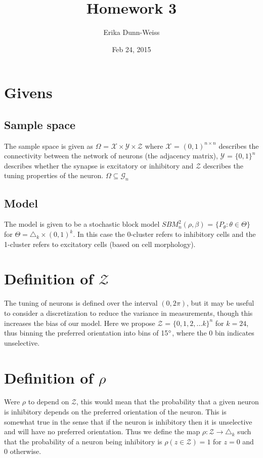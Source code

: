 \documentclass[psamsfonts]{amsart}
\title{Homework 3}
\author{Erika Dunn-Weiss}
\date{Feb 24, 2015}
\begin{document}
\maketitle

\section{Givens}
\subsection{Sample space} The sample space is given as $\Omega$ = $\mathcal{X} \times \mathcal{Y} \times \mathcal{Z}$
where $\mathcal{X}$ = $(0,1)^{n \times n}$ describes the connectivity between the network of neurons (the adjacency matrix), $\mathcal{Y}$ = $\{0,1\}^n$ describes whether the synapse is excitatory or inhibitory and $\mathcal{Z}$ describes the tuning properties of the neuron. $\Omega \subseteq \mathcal{G}_n$
\subsection{Model} The model is given to be a stochastic block model $SBM^2_n(\rho, \beta)$ = $\{P_\theta : \theta \in \Theta\}$ for $\Theta = \triangle_k \times (0,1)^k$. In this case the 0-cluster refers to inhibitory cells and the 1-cluster refers to excitatory cells (based on cell morphology). 

\section{Definition of $\mathcal{Z}$} The tuning of neurons is defined over the interval $(0,2\pi)$, but it may be useful to consider a discretization to reduce the variance in measurements, though this increases the bias of our model. Here we propose $\mathcal{Z}$ =  $\{0,1,2,...k\}^n$ for $k = 24$, thus binning the preferred orientation into bins of 15$\degree$, where the 0 bin indicates unselective.

\section{Definition of $\rho$} Were $\rho$ to depend on $\mathcal{Z}$, this would mean that the probability that a given neuron is inhibitory depends on the preferred orientation of the neuron. This is somewhat true in the sense that if the neuron is inhibitory then it is unselective and will have no preferred orientation. Thus we define the map $\rho: \mathcal{Z} \rightarrow  \triangle_k$ such that the probability of a neuron being inhibitory is $\rho(z \in \mathcal{Z}) = 1$ for $z = 0$ and 0 otherwise. 
\end{document}

